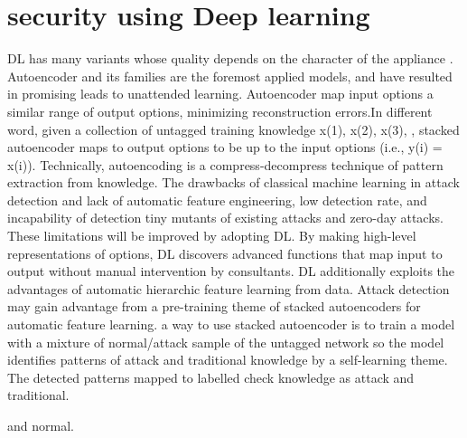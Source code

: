 \section{security using Deep learning}
DL has many variants whose quality depends on the character of the appliance . Autoencoder
and its families are the foremost applied  models, and have resulted in promising leads to unattended
learning. Autoencoder map input options a similar range of output options, minimizing
reconstruction errors.In different word, given a collection of untagged training knowledge x(1), x(2), x(3), , stacked
autoencoder maps to output options to be up to the input options (i.e., y(i) = x(i)). Technically, autoencoding
is a compress-decompress technique of pattern extraction from knowledge. The drawbacks of classical
machine learning in attack detection and lack of automatic feature engineering, low detection rate, and incapability of detection tiny mutants of existing attacks and zero-day attacks. These limitations will
be improved by adopting DL. By making high-level representations of options, DL discovers advanced
functions that map input to output without manual intervention by consultants. DL additionally exploits the advantages
of automatic hierarchic feature learning from data. Attack detection may gain advantage from a
pre-training theme of stacked autoencoders for automatic feature learning. a way to use stacked
autoencoder is to train a model with a mixture of normal/attack sample of the untagged network so the
model identifies patterns of attack and traditional knowledge by a self-learning theme. The detected patterns 
mapped to labelled check knowledge as attack and traditional.

and normal. 